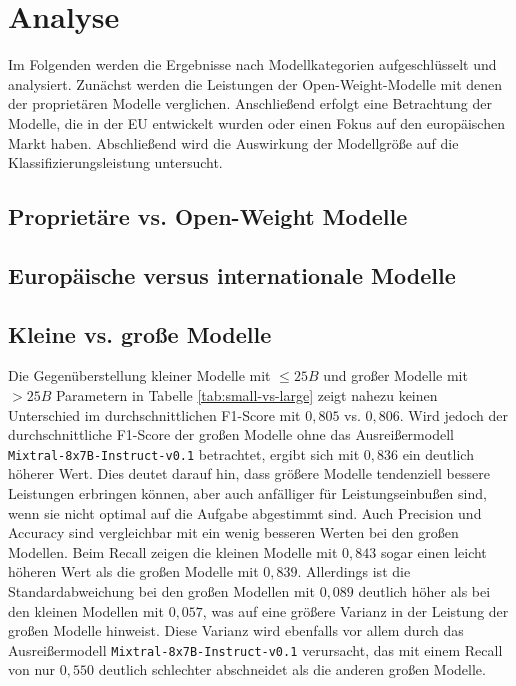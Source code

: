 \section{Analyse}\label{sec:analyse}

Im Folgenden werden die Ergebnisse nach Modellkategorien aufgeschlüsselt und analysiert. Zunächst werden die Leistungen der Open-Weight-Modelle mit denen der proprietären Modelle verglichen. Anschließend erfolgt eine Betrachtung der Modelle, die in der EU entwickelt wurden oder einen Fokus auf den europäischen Markt haben. Abschließend wird die Auswirkung der Modellgröße auf die Klassifizierungsleistung untersucht.

\subsection*{Proprietäre vs. Open-Weight Modelle}

\subsection*{Europäische versus internationale Modelle}

\subsection*{Kleine vs. große Modelle}

Die Gegenüberstellung kleiner Modelle mit $\leq 25B$ und großer Modelle mit $> 25B$ Parametern in Tabelle \ref{tab:small-vs-large} zeigt nahezu keinen Unterschied im durchschnittlichen F1-Score mit $0{,}805$ vs. $0{,}806$. Wird jedoch der durchschnittliche F1-Score der großen Modelle ohne das Ausreißermodell \texttt{Mixtral-8x7B-Instruct-v0.1} betrachtet, ergibt sich mit $0{,}836$ ein deutlich höherer Wert. Dies deutet darauf hin, dass größere Modelle tendenziell bessere Leistungen erbringen können, aber auch anfälliger für Leistungseinbußen sind, wenn sie nicht optimal auf die Aufgabe abgestimmt sind. Auch Precision und Accuracy sind vergleichbar mit ein wenig besseren Werten bei den großen Modellen. Beim Recall zeigen die kleinen Modelle mit $0{,}843$ sogar einen leicht höheren Wert als die großen Modelle mit $0{,}839$. Allerdings ist die Standardabweichung bei den großen Modellen mit $0{,}089$ deutlich höher als bei den kleinen Modellen mit $0{,}057$, was auf eine größere Varianz in der Leistung der großen Modelle hinweist. Diese Varianz wird ebenfalls vor allem durch das Ausreißermodell \texttt{Mixtral-8x7B-Instruct-v0.1} verursacht, das mit einem Recall von nur $0{,}550$ deutlich schlechter abschneidet als die anderen großen Modelle.

